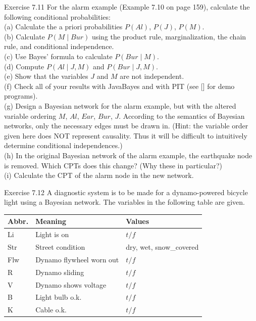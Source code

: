 \documentclass[10pt]{book}
\begin{document}
Exercise 7.11 For the alarm example (Example 7.10 on page 159), calculate the following conditional probabilities:\\
(a) Calculate the a priori probabilities $P(Al)$, $P(J)$, $P(M)$.\\
(b) Calculate $P(M \mid Bur)$ using the product rule, marginalization, the chain rule, and conditional independence.\\
(c) Use Bayes' formula to calculate $P(Bur \mid M)$.\\
(d) Compute $P(Al \mid J, M)$ and $P(Bur \mid J, M)$.\\
(e) Show that the variables $J$ and $M$ are not independent.\\[0pt]
(f) Check all of your results with JavaBayes and with PIT (see [\cite{ertel2011ai}] for demo programs).\\
(g) Design a Bayesian network for the alarm example, but with the altered variable ordering $M$, $Al$, $Ear$, $Bur$, $J$. According to the semantics of Bayesian networks, only the necessary edges must be drawn in. (Hint: the variable order given here does NOT represent causality. Thus it will be difficult to intuitively determine conditional independences.)\\
(h) In the original Bayesian network of the alarm example, the earthquake node is removed. Which CPTs does this change? (Why these in particular?)\\
(i) Calculate the CPT of the alarm node in the new network.

Exercise 7.12 A diagnostic system is to be made for a dynamo-powered bicycle light using a Bayesian network. The variables in the following table are given.
\begin{center}
\begin{tabular}{|l|l|l|}
\hline
Abbr. & Meaning & Values \\
\hline
Li & Light is on & $t / f$ \\
\hline
Str & Street condition & dry, wet, snow\_covered \\
\hline
Flw & Dynamo flywheel worn out & $t / f$ \\
\hline
R & Dynamo sliding & $t / f$ \\
\hline
V & Dynamo shows voltage & $t / f$ \\
\hline
B & Light bulb o.k. & $t / f$ \\
\hline
K & Cable o.k. & $t / f$ \\
\hline
\end{tabular}
\end{center}
\end{document}
